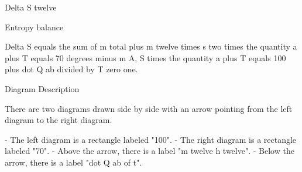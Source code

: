 Delta S twelve

Entropy balance

Delta S equals the sum of m total plus m twelve times s two times the quantity a plus T equals 70 degrees minus m A, S times the quantity a plus T equals 100 plus dot Q ab divided by T zero one.

Diagram Description

There are two diagrams drawn side by side with an arrow pointing from the left diagram to the right diagram.

- The left diagram is a rectangle labeled "100".
- The right diagram is a rectangle labeled "70".
- Above the arrow, there is a label "m twelve h twelve".
- Below the arrow, there is a label "dot Q ab of t".
